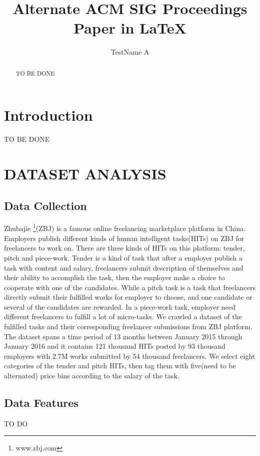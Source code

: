 \documentclass{sig-alternate-05-2015}
\begin{document}


\title{Alternate {\ttlit ACM} SIG Proceedings Paper in LaTeX}
\author{
\alignauthor
TestName A
}

\maketitle
\begin{abstract}
TO BE DONE
\end{abstract}
\printccsdesc

\section{Introduction}
TO BE DONE
\section{DATASET ANALYSIS}
\subsection{Data Collection}
Zhubajie \footnote{\label{footnote1}www.zbj.com}(ZBJ) is a famous online freelancing marketplace platform in China. Employers publish different kinds of human intelligent tasks(HITs) on  ZBJ for freelancers to work on. There are three kinds of HITs on this platform: tender, pitch and piece-work. Tender  is a kind of task that after a employer publish a task with content and salary, freelancers submit description of themselves and their ability to accomplish the task, then the employer make a choice to cooperate with one of the candidates. While a pitch task is a task that freelancers directly submit their fulfilled works for employer to choose, and one candidate or several of the candidates are rewarded. In a piece-work task, employer need different freelancers to fulfill a lot of micro-tasks. We crawled a dataset of the fulfilled tasks and their corresponding freelancer submissions from ZBJ platform. The dataset spans a time period of 13 months between January 2015 through January 2016 and it contains 121 thousand HITs posted by 93 thousand employers with 2.7M works submitted by 54 thousand freelancers. We select eight categories of the tender and pitch HITs, then tag them with five(need to be alternated) price bins according to the salary of the task.
\subsection{Data Features} TO DO
\end{document}
